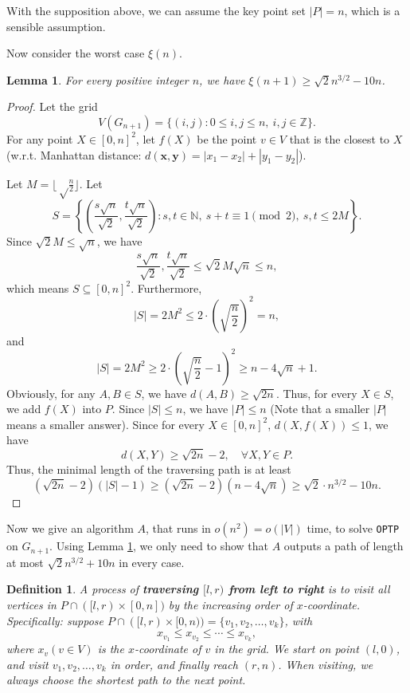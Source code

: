 \documentclass[12pt]{article}
\theoremstyle{plain}
\newtheorem{lemma}{Lemma}[section]
\newtheorem{definition}{Definition}[section]
\begin{document}
With the supposition above, we can assume the key point set $|P|=n$, which is a sensible assumption.

Now consider the worst case $\xi(n)$. 

\begin{lemma}
\label{hahaha1}
For every positive integer $n$, we have $\xi(n+1)\ge \sqrt{2}n^{3/2}-10n$.
\end{lemma}
\begin{proof}
Let the grid
$$V(G_{n+1})=\{(i,j):0\le i,j\le n,\ i,j\in \mathbb{Z}\}.$$
For any point $X\in [0,n]^2$, let $f(X)$ be the point $v\in V$ that is the closest to $X$ (w.r.t. Manhattan distance: $d(\mathbf{x},\mathbf{y})=|x_1-x_2|+|y_1-y_2|$).

Let $M=\lfloor \sqrt\frac{n}{2}\rfloor$. Let
$$S=\left\{\left(\dfrac{s\sqrt{n}}{\sqrt{2}},\dfrac{t\sqrt{n}}{\sqrt{2}}\right):s,t\in \mathbb{N},\ s+t\equiv 1\pmod 2,\ s,t\le 2M\right\}.$$
Since $\sqrt{2}M\le \sqrt{n}$, we have
$$\dfrac{s\sqrt{n}}{\sqrt{2}},\dfrac{t\sqrt{n}}{\sqrt{2}}\le \sqrt{2}M\sqrt{n}\le n,$$
which means $S\subseteq [0,n]^2$. Furthermore,
$$|S|=2M^2\le 2\cdot \left(\sqrt{\dfrac{n}{2}}\right)^2=n,$$
and
$$|S|=2M^2\ge 2\cdot \left(\sqrt{\dfrac{n}{2}}-1\right)^2\ge n-4\sqrt{n}+1.$$
Obviously, for any $A,B\in S$, we have $d(A,B)\ge \sqrt{2n}$. Thus, for every $X\in S$, we add $f(X)$ into $P$. Since $|S|\le n$, we have $|P|\le n$ (Note that a smaller $|P|$ means a smaller answer). Since for every $X\in [0,n]^2$, $d(X,f(X))\le 1$, we have
$$d(X,Y)\ge \sqrt{2n}-2,\quad \forall X,Y\in P.$$
Thus, the minimal length of the traversing path is at least
$$(\sqrt{2n}-2)(|S|-1)\ge (\sqrt{2n}-2)(n-4\sqrt{n})\ge \sqrt{2}\cdot n^{3/2}-10n.$$
\end{proof}

Now we give an algorithm $A$, that runs in $o(n^2)=o(|V|)$ time, to solve \texttt{OPTP} on $G_{n+1}$. Using Lemma \ref{hahaha1}, we only need to show that $A$ outputs a path of length at most $\sqrt{2}n^{3/2}+10n$ in every case.

\begin{definition}
    \label{def5.1}
A process of \textbf{traversing $[l,r)$ from left to right} is to visit all vertices in $P\cap ([l,r)\times [0,n])$ by the increasing order of $x$-coordinate. Specifically: suppose $P\cap ([l,r)\times [0,n))=\{v_1,v_2,\ldots,v_k\}$, with
$$x_{v_1}\le x_{v_2}\le \cdots\le x_{v_k},$$
where $x_{v}(v\in V)$ is the $x$-coordinate of $v$ in the grid. We start on point $(l,0)$, and visit $v_1,v_2,\ldots,v_k$ in order, and finally reach $(r,n)$. When visiting, we always choose the shortest path to the next point.
\end{definition}
\end{document}
